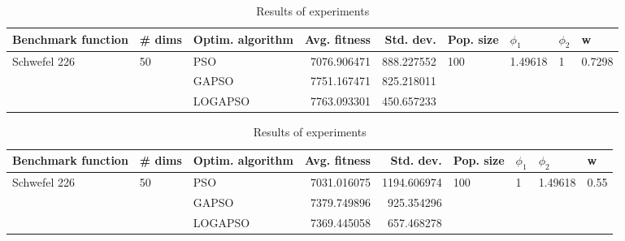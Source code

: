\documentclass{article}
\begin{document}
\begin{table}
\centering
\caption{Results of experiments}
\begin{tabular}{lllrrllll}
\toprule
           Benchmark function &             \# dims & Optim. algorithm &  Avg. fitness &  Std. dev. &            Pop. size &               $\phi_{1}$ &         $\phi_{2}$ &                       w \\
\midrule
\multirow{3}{*}{Schwefel 226} & \multirow{3}{*}{50} &              PSO &   7076.906471 & 888.227552 & \multirow{3}{*}{100} & \multirow{3}{*}{1.49618} & \multirow{3}{*}{1} & \multirow{3}{*}{0.7298} \\
                              &                     &            GAPSO &   7751.167471 & 825.218011 &                      &                          &                    &                         \\
                              &                     &          LOGAPSO &   7763.093301 & 450.657233 &                      &                          &                    &                         \\
\bottomrule
\end{tabular}
\end{table}
\begin{table}
\centering
\caption{Results of experiments}
\begin{tabular}{lllrrllll}
\toprule
           Benchmark function &             \# dims & Optim. algorithm &  Avg. fitness &   Std. dev. &            Pop. size &         $\phi_{1}$ &               $\phi_{2}$ &                     w \\
\midrule
\multirow{3}{*}{Schwefel 226} & \multirow{3}{*}{50} &              PSO &   7031.016075 & 1194.606974 & \multirow{3}{*}{100} & \multirow{3}{*}{1} & \multirow{3}{*}{1.49618} & \multirow{3}{*}{0.55} \\
                              &                     &            GAPSO &   7379.749896 &  925.354296 &                      &                    &                          &                       \\
                              &                     &          LOGAPSO &   7369.445058 &  657.468278 &                      &                    &                          &                       \\
\bottomrule
\end{tabular}
\end{table}
\end{document}
